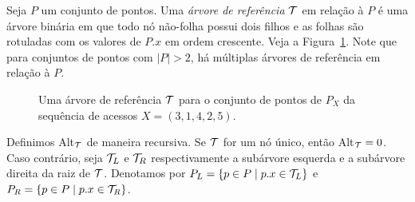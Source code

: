 Seja $P$ um conjunto de pontos. Uma \textit{árvore de referência} $\mathcal{T}$ em relação à $P$ é uma árvore binária em que todo nó não-folha possui dois filhos e as folhas são rotuladas com os valores de $P$\hspace{-0.05cm}$.x$ em ordem crescente. Veja a Figura~\ref{fig:arvore_de_referencia_exemplo_inicial}. Note que para conjuntos de pontos com $|P| > 2$, há múltiplas árvores de referência em relação à $P$.
\begin{figure}
    \caption{Uma árvore de referência $\mathcal{T}$ para o conjunto de pontos de $P_X$ da sequência de acessos $X = (3,1,4,2,5)$.}
\label{fig:arvore_de_referencia_exemplo_inicial}
\end{figure}

Definimos Alt$_{\mathcal{T}}$ de maneira recursiva. Se $\mathcal{T}$ for um nó único, então Alt$_{\mathcal{T}} = 0$. Caso contrário, seja $\mathcal{T}_{L}$ e $\mathcal{T}_{R}$ respectivamente a subárvore esquerda e a subárvore direita da raiz de $\mathcal{T}$. Denotamos por $P_L = \{p \in P \mid p.x \in \mathcal{T}_L\}$ e $P_R = \{p \in P \mid p.x \in \mathcal{T}_R\}$. 

